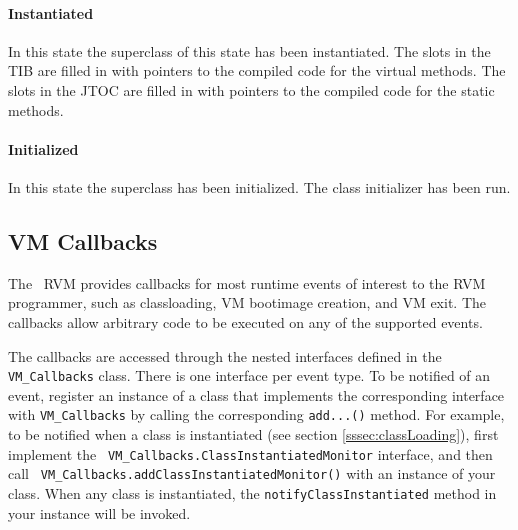 \paragraph{Instantiated}
In this state the superclass of this state has been instantiated. 
The slots in the TIB are filled in with pointers to the compiled code for the 
virtual methods. 
The slots in the JTOC are filled in with pointers to the compiled code for the 
static methods.

\paragraph{Initialized} 
In this state the superclass has been initialized. The class initializer has 
been run. 

\subsection{VM Callbacks}\label{sssec:callbacks}

The \jp\ RVM provides callbacks for most runtime events of interest to the RVM
programmer, such as classloading, VM bootimage creation, and VM exit.  The
callbacks allow arbitrary code to be executed on any of the supported events.

The callbacks are accessed through the nested interfaces defined in the {\tt
VM\_Callbacks} class.  There is one interface per event type.  To be notified
of an event, register an instance of a class that implements the corresponding
interface with {\tt VM\_Callbacks} by calling the corresponding {\tt add...()}
method.  For example, to be notified when a class is instantiated (see section
\ref{sssec:classLoading}), first implement the {\tt
VM\_Callbacks.ClassInstantiatedMonitor} interface, and then call {\tt
VM\_Callbacks.addClassInstantiatedMonitor()} with an instance of your class.
When any class is instantiated, the {\tt notifyClassInstantiated} method in
your instance will be invoked.

